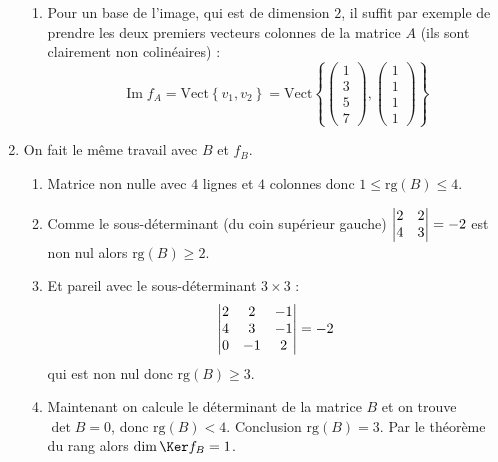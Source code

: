 \documentclass[11pt,a4paper]{article}
\renewcommand{\Im}{\mathop{\mathrm{Im}}\nolimits}
\renewcommand{\ge}{\geqslant} \renewcommand{\geq}{\geqslant}
\renewcommand{\le}{\leqslant} \renewcommand{\leq}{\leqslant}
\begin{document}
\begin{enumerate}
\begin{enumerate}
     \item Pour un base de l'image, qui est de dimension $2$, 
     il suffit par exemple de prendre les deux premiers vecteurs colonnes de la matrice $A$ (ils sont clairement non colinéaires) :
$$\Im f_A = \textrm{Vect} \left\{ v_1, v_2 \right\} = 
\textrm{Vect} \left\{  \begin{pmatrix}1\\3\\5\\7\end{pmatrix},  \begin{pmatrix}1\\1\\1\\1\end{pmatrix} \right\}
$$

  \end{enumerate}


  \item On fait le même travail avec $B$ et $f_B$.
  \begin{enumerate}
     \item Matrice non nulle avec $4$ lignes et $4$ colonnes donc $1 \le \textrm{rg}(B) \le 4$.

     \item Comme le sous-déterminant (du coin supérieur gauche)
$\begin{vmatrix} 
2 & 2 \cr
4 & 3 \cr
\end{vmatrix}= -2$ est non nul alors $\textrm{rg}(B) \ge 2$.

     \item Et pareil avec le sous-déterminant $3\times 3$ :
$$\begin{vmatrix} 
2 & 2 & -1 \cr
4 & 3 & -1 \cr
0 & -1 & 2 \cr
\end{vmatrix} = -2$$
qui est non nul donc $\textrm{rg}(B) \ge 3$.

     \item Maintenant on calcule le déterminant de la matrice $B$ et 
on trouve $\det B = 0$, donc $\textrm{rg}(B) < 4$. Conclusion $\textrm{rg}(B) = 3$.
Par le théorème du rang alors $\dim \Ker f_B=1$.




\end{enumerate}
\end{enumerate}
\end{document}
